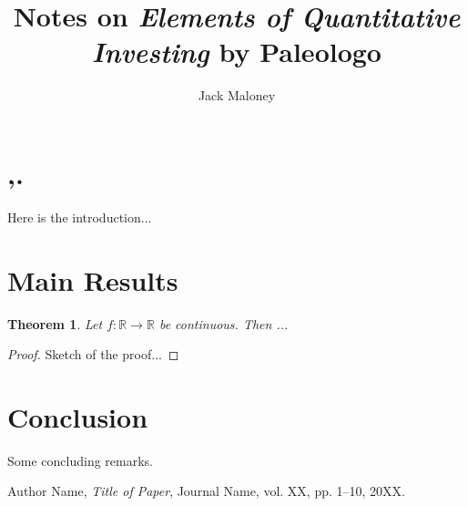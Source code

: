 \documentclass[11pt]{amsart}
\newtheorem{theorem}{Theorem}[section]
\theoremstyle{definition}
\theoremstyle{remark}
\newcommand{\R}{\mathbb{R}}
\begin{document}
\title{Notes on \textit{Elements of Quantitative Investing} by Paleologo}
\author{Jack Maloney}


\maketitle

\section{,.}

Here is the introduction...

\section{Main Results}

\begin{theorem}
Let $f: \R \to \R$ be continuous. Then ...
\end{theorem}

\begin{proof}
Sketch of the proof...
\end{proof}

\section{Conclusion}

Some concluding remarks.

\begin{thebibliography}{9}

Author Name, \emph{Title of Paper}, Journal Name, vol. XX, pp. 1--10, 20XX.

\end{thebibliography}
\end{document}
